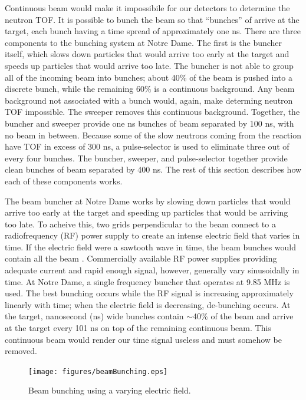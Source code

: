 Continuous beam would make it impossibile for our detectors to determine the neutron TOF.  It is possible to bunch the beam so that ``bunches'' of  arrive at the target, each bunch having a time spread of approximately one ns. There are three components to the bunching system at Notre Dame.  The first is the buncher itself, which slows down particles that would arrive too early at the target and speeds up particles that would arrive too late.  The buncher is not able to group all of the incoming beam into bunches; about 40\% of the beam is pushed into a discrete bunch, while the remaining 60\% is a continuous background.  Any beam background not associated with a bunch would, again, make determing neutron TOF impossible.  The sweeper removes this continuous background.  Together, the buncher and sweeper provide one ns bunches of beam separated by 100 ns, with no beam in between.  Because some of the slow neutrons coming from the reaction have TOF in excess of 300 ns, a pulse-selector is used to eliminate three out of every four bunches.  The buncher, sweeper, and pulse-selector together provide clean bunches of beam separated by 400 ns.  The rest of this section describes how each of these components works.

The beam buncher at Notre Dame works by slowing down particles that would arrive too early at the target and speeding up particles that would be arriving too late.  To acheive this, two grids perpendicular to the beam connect to a radiofrequency (RF) power supply to create an intense electric field that varies in time.  If the electric field were a sawtooth wave in time, the beam bunches would contain all the beam \cite{LynchBunching}.  Commercially available RF power supplies providing adequate current and rapid enough signal, however, generally vary sinusoidally in time.  At Notre Dame, a single frequency buncher that operates at 9.85 MHz is used.  The best bunching occurs while the RF signal is increasing approximately linearly with time; when the electric field is decreasing, de-bunching occurs.  At the target, nanosecond (ns) wide bunches contain $\sim$40\% of the beam and arrive at the target every 101 ns on top of the remaining continuous beam.  This continuous beam would render our time signal useless and must somehow be removed.

\begin{figure}[htp]
\centering
\texttt{[image: figures/beamBunching.eps]}
\label{fig:bunching}
\caption{Beam bunching using a varying electric field.}
\end{figure}

